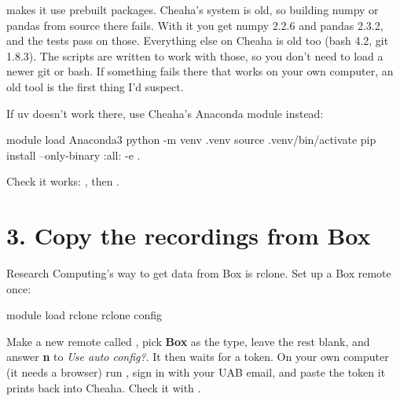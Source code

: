  makes it use prebuilt packages. Cheaha's system is old, so building numpy or pandas from source there fails. With it you get numpy 2.2.6 and pandas 2.3.2, and the tests pass on those. Everything else on Cheaha is old too (bash 4.2, git 1.8.3). The scripts are written to work with those, so you don't need to load a newer git or bash. If something fails there that works on your own computer, an old tool is the first thing I'd suspect.

If uv doesn't work there, use Cheaha's Anaconda module instead:
\begin{codebox}
module load Anaconda3
python -m venv .venv
source .venv/bin/activate
pip install --only-binary :all: -e .
\end{codebox}
Check it works: , then .

\section{3. Copy the recordings from Box}
Research Computing's way to get data from Box is rclone. Set up a Box remote once:
\begin{codebox}
module load rclone
rclone config
\end{codebox}
Make a new remote called , pick \textbf{Box} as the type, leave the rest blank, and answer \textbf{n} to \textit{Use auto config?}. It then waits for a token. On your own computer (it needs a browser) run , sign in with your UAB email, and paste the token it prints back into Cheaha. Check it with .

